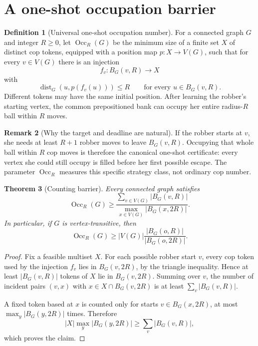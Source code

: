 \documentclass[11pt]{amsart}
\newtheorem{theorem}{Theorem}[section]
\theoremstyle{definition}
\newtheorem{definition}[theorem]{Definition}
\newtheorem{remark}[theorem]{Remark}
\newcommand{\dist}{\operatorname{dist}}
\newcommand{\Occ}{\operatorname{Occ}}
\begin{document}
\section{A one-shot occupation barrier}

\begin{definition}[Universal one-shot occupation number]\label{def:occ}
For a connected graph $G$ and integer $R\ge0$, let $\Occ_R(G)$ be the minimum
size of a finite set $X$ of distinct cop tokens, equipped with a position map
$p:X\to V(G)$, such that for every $v\in V(G)$ there is an injection
\[
 f_v:B_G(v,R)\longrightarrow X
\]
with
\[
 \dist_G(u,p(f_v(u)))\le R
 \qquad\text{for every }u\in B_G(v,R).
\]
Different tokens may have the same initial position.  After learning the
robber's starting vertex, the common prepositioned bank can occupy her entire
radius-$R$ ball within $R$ moves.
\end{definition}

\begin{remark}[Why the target and deadline are natural]
If the robber starts at $v$, she needs at least $R+1$ robber moves to leave
$B_G(v,R)$.  Occupying that whole ball within $R$ cop moves is therefore the
canonical one-shot certificate: every vertex she could still occupy is filled
before her first possible escape.  The parameter $\Occ_R$ measures this
specific strategy class, not ordinary cop number.
\end{remark}

\begin{theorem}[Counting barrier]\label{thm:occ-lower}
Every connected graph satisfies
\[
 \boxed{
 \Occ_R(G)
 \ge
 \frac{\sum_{v\in V(G)}|B_G(v,R)|}
 {\max_{x\in V(G)}|B_G(x,2R)|}.
 }
\]
In particular, if $G$ is vertex-transitive, then
\[
 \boxed{
 \Occ_R(G)
 \ge
 |V(G)|\frac{|B_G(o,R)|}{|B_G(o,2R)|}.
 }
\]
\end{theorem}

\begin{proof}
Fix a feasible multiset $X$.  For each possible robber start $v$, every cop
token used by the injection $f_v$ lies in $B_G(v,2R)$, by the triangle
inequality.  Hence at least $|B_G(v,R)|$ tokens of $X$ lie in $B_G(v,2R)$.
Summing over $v$, the number of incident pairs $(v,x)$ with
$x\in X\cap B_G(v,2R)$ is at least
$\sum_v|B_G(v,R)|$.

A fixed token based at $x$ is counted only for starts
$v\in B_G(x,2R)$, at most $\max_y|B_G(y,2R)|$ times.  Therefore
\[
 |X|\max_y|B_G(y,2R)|
 \ge
 \sum_v|B_G(v,R)|,
\]
which proves the claim.
\end{proof}
\end{document}
